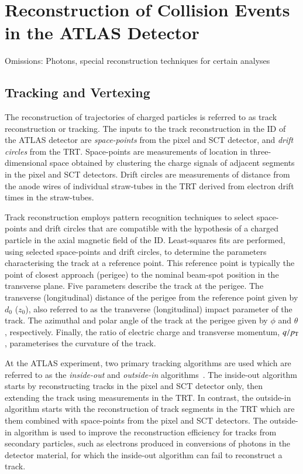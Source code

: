 \section{Reconstruction of Collision Events in the ATLAS Detector}%
\label{sec:object_reco_at_atlas}


Omissions: Photons, special reconstruction techniques for certain analyses


\subsection{Tracking and Vertexing}

The reconstruction of trajectories of charged particles is referred to as track
reconstruction or tracking. The inputs to the track reconstruction in the ID of
the ATLAS detector are \emph{space-points} from the pixel and SCT detector, and
\emph{drift circles} from the TRT. Space-points are measurements of location in
three-dimensional space obtained by clustering the charge signals of adjacent
segments in the pixel and SCT detectors. Drift circles are measurements of
distance from the anode wires of individual straw-tubes in the TRT derived from
electron drift times in the straw-tubes.

Track reconstruction employs pattern recognition techniques to select
space-points and drift circles that are compatible with the hypothesis of a
charged particle in the axial magnetic field of the ID. Least-squares fits are
performed, using selected space-points and drift circles, to determine the
parameters characterising the track at a reference point. This reference point
is typically the point of closest approach (perigee) to the nominal beam-spot
position in the transverse plane. Five parameters describe the track at the
perigee. The transverse (longitudinal) distance of the perigee from the
reference point given by $d_0$ ($z_0$), also referred to as the transverse
(longitudinal) impact parameter of the track. The azimuthal and polar angle of
the track at the perigee given by $\phi$ and $\theta$, respectively. Finally,
the ratio of electric charge and transverse momentum, $q / p_{\text{T}}$, parameterises
the curvature of the track.

At the ATLAS experiment, two primary tracking algorithms are used which are
referred to as the \emph{inside-out} and \emph{outside-in}
algorithms~\cite{Cornelissen:2007vba,Salzburger:2015sgq,PERF-2015-08}. The
inside-out algorithm starts by reconstructing tracks in the pixel and SCT
detector only, then extending the track using measurements in the TRT. In
contrast, the outside-in algorithm starts with the reconstruction of track
segments in the TRT which are them combined with space-points from the pixel and
SCT detectors. The outside-in algorithm is used to improve the reconstruction
efficiency for tracks from secondary particles, such as electrons produced in
conversions of photons in the detector material, for which the inside-out
algorithm can fail to reconstruct a track.

